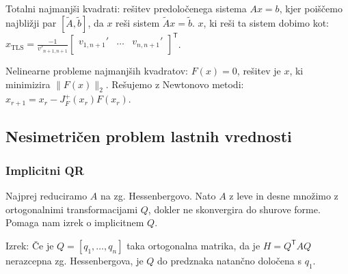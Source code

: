 \documentclass[a4paper,10pt]{article}
\theoremstyle{definition}
\newcommand{\T}{\mathsf{T}\!}
\begin{document}
Totalni najmanjši kvadrati:
rešitev predoločenega sistema $Ax = b$, kjer poiščemo najbližji par $[\tilde{A},
\tilde{b}]$, da $x$ reši sistem $\tilde{A}x = \tilde{b}$.
$x$, ki reši ta sistem dobimo kot:
$x_{\text{TLS}} = \frac{-1}{v'_{n+1,n+1}}
  \begin{bmatrix}
    v_{1,n+1}' & \dots & v_{n,n+1}' \\
  \end{bmatrix}^\T$.

Nelinearne probleme najmanjših kvadratov: $F(x) = 0$, rešitev je $x$, ki
minimizira $\|F(x)\|_2$. Rešujemo z Newtonovo metodi:
$x_{r+1} = x_r - J_F^+(x_r)F(x_r)$.

\subsection*{Nesimetričen problem lastnih vrednosti}
\subsubsection*{Implicitni QR}
Najprej reduciramo $A$ na zg. Hessenbergovo. Nato $A$ z leve in desne množimo z
ortogonalnimi transformacijami $Q$, dokler ne skonvergira do shurove forme.
Pomaga nam izrek o implicitnem $Q$.

Izrek: Če je $Q  = [q_1, \dots, q_n]$ taka ortogonalna matrika, da je $H = Q^\T
A Q$ nerazcepna zg. Hessenbergova, je $Q$ do predznaka natančno določena s $q_1$.
\end{document}
